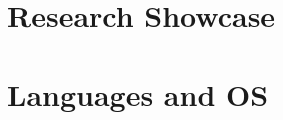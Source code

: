 \documentclass[letterpaper,11pt]{article}
\makeatletter
\newcommand{\resumeProjectHeading}[2]{
    \item
    \begin{tabular*}{1.001\textwidth}{l@{\extracolsep{\fill}}r}
      \footnotesize#1 & \textbf{\footnotesize #2}\\
    \end{tabular*}\vspace{-7pt}
}
\newcommand{\resumeSubHeadingListStart}{\begin{itemize}[leftmargin=0.0in, label={}]}
\newcommand{\resumeSubHeadingListEnd}{\end{itemize}}
\makeatother
\begin{document}
\section{Research Showcase}
\resumeSubHeadingListStart
\resumeSubHeadingListEnd

\renewcommand{\renderHck}[1]{
      \resumeProjectHeading
      {\textbf{\csname #1@Title\endcsname} $|$ \csname #1@Position\endcsname}
      {\csname #1@Date\endcsname}
      \csname #1@Highlights\endcsname
}
\resumeSubHeadingListStart
\resumeSubHeadingListEnd

\renewcommand{\renderHck}[1]{
      \resumeProjectHeading
      {\textbf{\csname #1@Title\endcsname} $|$ \csname #1@Position\endcsname}
      {\csname #1@Date\endcsname}
      \csname #1@Highlights\endcsname
}
\section{Languages and OS}
\skills
\end{document}

